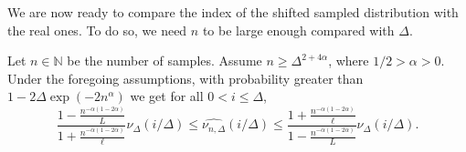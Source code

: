 \documentclass[11pt]{article}
\renewcommand{\geq}{\geqslant}
\renewcommand{\leq}{\leqslant}
\newcommand{\N}{\mathbb{N}}
\begin{document}

We are now ready to compare the index of the shifted sampled distribution with the real ones.
To do so, we need  $n$ to be large enough compared with  $\Delta$.

\begin{lemma}\label{lem:probaSample}
  Let $n \in \N$ be the number of samples. Assume $n \geq \Delta^{2 +4\alpha}$, where $1/2 > \alpha >0$. Under the foregoing assumptions, 
  with probability greater than $1-2 \Delta \exp(-2n^\alpha)$ we get for all $0<i\leq \Delta$,
   $$\frac{1 -
    \frac{n^{-\alpha (1-2\alpha)}}{L}}{1+\frac{n^{-\alpha (1-2\alpha)}}{\ell}}
    \nu_\Delta(i/\Delta)
    \leq \widehat{\nu_{n, \Delta}}(i/\Delta) \leq \frac{1 + \frac{n^{-\alpha (1-2\alpha)}}{\ell}}{1 -
    \frac{n^{-\alpha (1-2\alpha)}}{L}} \nu_\Delta(i/\Delta).$$
\end{lemma}
\end{document}
